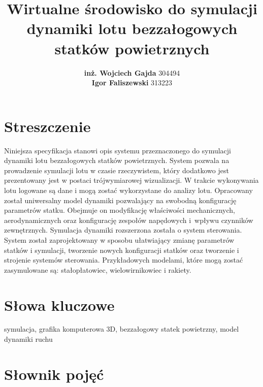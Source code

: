 \documentclass[15pt]{sprawozdanie}
\title{Wirtualne środowisko do symulacji dynamiki lotu bezzałogowych statków powietrznych}
\author{\textbf{inż. Wojciech Gajda} 304494\\\vspace{20pt}\textbf{Igor Faliszewski} 313223}
\begin{document}
\maketitle
%


\section*{Streszczenie}
Niniejsza specyfikacja stanowi opis systemu przeznaczonego do symulacji dynamiki lotu bezzałogowych statków powietrznych. System pozwala na prowadzenie symulacji lotu w czasie rzeczywistem, który dodatkowo jest prezentowany jest w postaci trójwymiarowej wizualizacji. W trakcie wykonywania lotu logowane są dane i mogą zostać wykorzystane do analizy lotu. Opracowany został uniwersalny model dynamiki pozwalający na swobodną konfigurację parametrów statku. Obejmuje on modyfikację właściwości mechanicznych, aerodynamicznych oraz konfigurację zespołów napędowych i~wpływu czynników zewnętrznych. Symulacja dynamiki rozszerzona została o system sterowania. System został zaprojektowany w sposobu ułatwiający zmianę parametrów statków i symulacji, tworzenie nowych konfiguracji statków oraz tworzenie i strojenie systemów sterowania. Przykładowych modelami, które mogą zostać zasymulowane są: stałopłatowiec, wielowirnikowiec i rakiety. 

\section*{Słowa kluczowe}

symulacja, grafika komputerowa 3D, bezzałogowy statek powietrzny, model dynamiki ruchu





\newpage

\section{Słownik pojęć}
\end{document}
